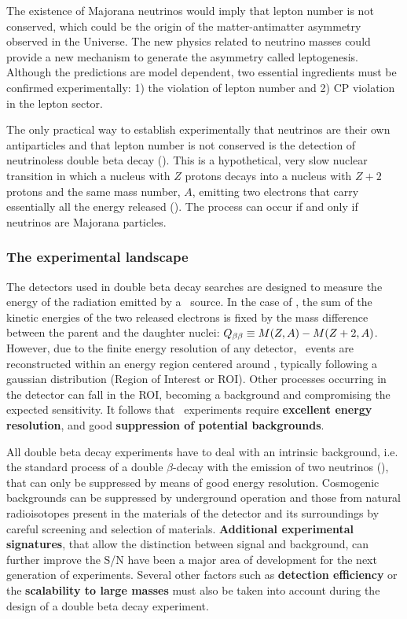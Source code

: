\documentclass[a4paper,11pt,oneside]{article}
\begin{document}
The existence of Majorana neutrinos would imply that lepton number is not conserved, which could be the origin of the matter-antimatter asymmetry observed in the Universe. The new physics related to neutrino masses could provide a new mechanism to generate the asymmetry called leptogenesis. Although the predictions are model dependent, two essential ingredients must be confirmed experimentally: 1) the violation of lepton number and 2) CP violation in the lepton sector. 

The only practical way to establish experimentally that neutrinos are their own antiparticles and that lepton number is not conserved is the detection of neutrinoless double beta decay (\bbonu). This is a hypothetical, very slow nuclear transition in which a nucleus with $Z$ protons decays into a nucleus with $Z+2$ protons and the same mass number, $A$, emitting two electrons that carry essentially all the energy released (\Qbb). The process can occur if and only if neutrinos are Majorana particles.

\subsubsection*{The experimental landscape}
The detectors used in double beta decay searches are designed to measure the energy of the radiation emitted by a \bb\ source. In the case of \bbonu, the sum of the kinetic energies of the two released electrons is fixed by the mass difference between the parent and the daughter nuclei: $Q_{\beta\beta} \equiv M(Z,A)-M(Z+2,A)$. However, due to the finite energy resolution of any detector, \bbonu\ events are reconstructed within an energy region centered around \Qbb, typically following a gaussian distribution (Region of Interest or ROI). Other processes occurring in the detector can fall in the ROI, becoming a background and compromising the expected sensitivity. It follows that \bbonu\ experiments require {\bf excellent energy resolution}, and good {\bf suppression of potential backgrounds}.

All double beta decay experiments have to deal with an intrinsic
background, i.e. the standard process of a double $\beta$-decay with
the emission of two neutrinos (\bbtnu), that can only be suppressed by
means of good energy resolution. Cosmogenic backgrounds can be
suppressed by underground operation and those from natural
radioisotopes present in the materials of the detector and its
surroundings by careful screening and selection of materials. {\bf
  Additional experimental signatures}, that allow the distinction
between signal and background, can further improve the S/N have been a
major area of development for the next generation of
experiments. Several other factors such as {\bf detection efficiency}
or the {\bf scalability to large masses} must also be taken into account during the design of a double beta decay experiment.
 
\end{document}
